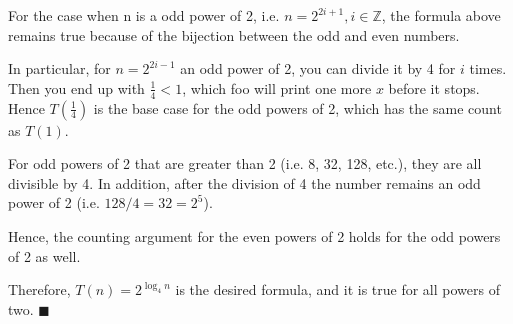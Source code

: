 \documentclass[12pt]{article}
\begin{document}
{For the case when n is a odd power of 2, i.e. $n = 2^{2i+1}, i \in \mathbb{Z}$, the formula above remains true because of the bijection between the odd and even numbers.

In particular, for $n = 2^{2i-1}$ an odd power of 2, you can divide it by 4 for $i$ times. 
Then you end up with $\frac{1}{4} < 1$, which foo will print one more $x$ before it stops. Hence $T(\frac{1}{4})$ is the base case for the odd powers of 2, which has the same count as $T(1)$.

For odd powers of 2 that are greater than 2 (i.e. 8, 32, 128, etc.), they are all divisible by 4.  
In addition, after the division of 4 the number remains an odd power of 2 (i.e. $128/4 = 32 = 2^5$). 

Hence, the counting argument for the even powers of 2 holds for the odd powers of 2 as well.

Therefore, $T(n) = 2^{\log_{4} n}$ is the desired formula, and it is true for all powers of two.
\hfill $\blacksquare$
}
\end{document}

